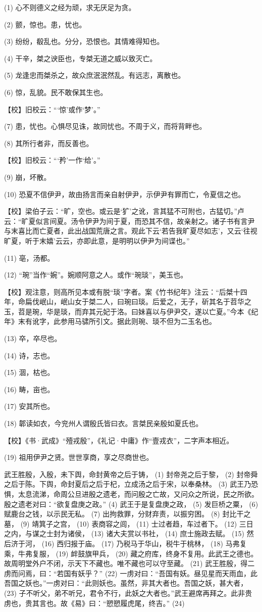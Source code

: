 \documentclass[12pt,UTF8]{ctexbook}
\begin{document}
(1) 心不则德义之经为顽，求无厌足为贪。

(2) 颤，惊也。患，忧也。

(3) 纷纷，殽乱也。分分，恐恨也。其情难得知也。

(4) 干辛，桀之谀臣也，专桀无道之威以致灭亡。

(5) 龙逢忠而桀杀之，故众庶泯泯然乱。有远志，离散也。

(6) 惊，乱貌。民不敢保其生也。

【校】旧校云：“‘惊’或作‘梦’。”

(7) 患，忧也。心惧尽见诛，故同忧也。不周于义，而将背畔也。

(8) 其所行者非，而反善也。

【校】旧校云：“‘矜’一作‘给’。”

(9) 崩，坏散。

(10) 恐夏不信伊尹，故由扬言而亲自射伊尹，示伊尹有罪而亡，令夏信之也。

【校】梁伯子云：“旷，空也。或云是‘犷’之讹，言其猛不可附也，古猛切。”卢云：“旷夏似言间夏。汤令伊尹为间于夏，而恐其不信，故亲射之。诸子书有言尹与末喜比而亡夏者，此出战国荒唐之言。观此下云‘若告我旷夏尽如志’，又云‘往视旷夏，听于末嬉’云云，亦即此意，是明明以伊尹为间谍也。”

(11) 亳，汤都。

(12) “琬”当作“婉”。婉顺阿意之人。或作“琬琰”，美玉也。

【校】观注意，则高所见本或有脱“琰”字者。案《竹书纪年》注云：“后桀十四年，命扁伐岷山，岷山女于桀二人，曰琬曰琰。后爱之，无子，斫其名于苕华之玉，苕是琬，华是琰，而弃其元妃于洛。曰妹喜以与伊尹交，遂以亡夏。”今本《纪年》末有讹字，此参用马骕所引文。据此则琬、琰不但为二玉名也。

(13) 卒，卒尽也。

(14) 诗，志也。

(15) 涸，枯也。

(16) 畴，亩也。

(17) 安其所也。

(18) 郼读如衣，今兖州人谓殷氏皆曰衣。言桀民亲殷如夏氏也。

【校】《书·武成》“殪戎殷”，《礼记·中庸》作“壹戎衣”，二字声本相近。

(19) 祖用伊尹之贤。世世享商，享之尽商世也。

武王胜殷，入殷，未下舆，命封黄帝之后于铸， (1) 封帝尧之后于黎， (2) 封帝舜之后于陈。下舆，命封夏后之后于杞，立成汤之后于宋，以奉桑林。 (3) 武王乃恐惧，太息流涕，命周公旦进殷之遗老，而问殷之亡故，又问众之所说，民之所欲。殷之遗老对曰：“欲复盘庚之政。” (4) 武王于是复盘庚之政， (5) 发巨桥之粟， (6) 赋鹿台之钱，以示民无私。 (7) 出拘救罪，分财弃责，以振穷困。 (8) 封比干之墓， (9) 靖箕子之宫， (10) 表商容之闾， (11) 士过者趋，车过者下。 (12) 三日之内，与谋之士封为诸侯， (13) 诸大夫赏以书社， (14) 庶士施政去赋。 (15) 然后济于河， (16) 西归报于庙。 (17) 乃税马于华山，税牛于桃林， (18) 马弗复乘，牛弗复服， (19) 衅鼓旗甲兵， (20) 藏之府库，终身不复用。此武王之德也。故周明堂外户不闭，示天下不藏也。唯不藏也可以守至藏。 (21) 武王胜殷，得二虏而问焉，曰：“若国有妖乎？” (22) 一虏对曰：“吾国有妖。昼见星而天雨血，此吾国之妖也。”一虏对曰：“此则妖也。虽然，非其大者也。吾国之妖，甚大者， (23) 子不听父，弟不听兄，君令不行，此妖之大者也。”武王避席再拜之。此非贵虏也，贵其言也。故《易》曰：“愬愬履虎尾，终吉。” (24)
\end{document}
